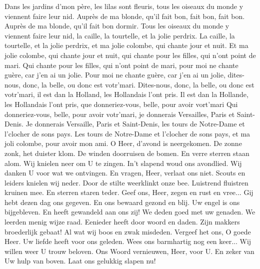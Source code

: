 \documentclass{article}
\begin{document}
\begin{songs}{}
\begin{intersong}
\end{intersong}
\beginverse
Dans les jardins d'mon père, les lilas sont fleuris, tous les oiseaux du monde y viennent faire leur nid.
\endverse
\beginchorus
Auprès de ma blonde, qu'il fait bon, fait bon, fait bon.
Auprès de ma blonde, qu'il fait bon dormir.
\endchorus
\beginverse
Tous les oiseaux du monde y viennent faire leur nid, la caille, la tourtelle, et la jolie perdrix.
\endverse
\beginverse
La caille, la tourtelle, et la jolie perdrix, et ma jolie colombe, qui chante jour et nuit.
\endverse
\beginverse
Et ma jolie colombe, qui chante jour et nuit, qui chante pour les filles, qui n’ont point de mari.
\endverse
\beginverse
Qui chante pour les filles, qui n’ont point de mari, pour moi ne chante guère, car j’en ai un jolie.
\endverse
\beginverse
Pour moi ne chante guère, car j’en ai un jolie, dites-nous, donc, la belle, ou donc est votr’mari.
\endverse
\beginverse
Dites-nous, donc, la belle, ou donc est votr’mari, il est dan la Holland, les Hollandais l’ont pris.
\endverse
\beginverse
Il est dan la Hollande, les Hollandais l’ont pris, que donneriez-vous, belle, pour avoir vort’mari
\endverse
\beginverse
Qui donneriez-vous, belle, pour avoir votr’mari, je donnerais Versailles, Paris et Saint-Denis.
\endverse
\beginverse
Je donnerais Versaille, Paris et Saint-Denis, les tours de Notre-Dame et l’clocher de sons pays.
\endverse
\beginverse
Les tours de Notre-Dame et l’clocher de sons pays, et ma joli colombe, pour avoir mon ami.
\endverse
\endsong
{}
\beginverse
O Heer, d'avond is neergekomen. De zonne zonk, het duister klom. De winden doorruisen de bomen. En verre sterren staan alom. Wij knielen neer om U te zingen. In't slapend woud ons avondlied. Wij danken U voor wat we ontvingen. En vragen, Heer, verlaat ons niet.
\endverse
\beginchorus
Scouts en leiders knielen wij neder. Door de stilte weerklinkt onze bee. Luistrend fluistren kruinen mee. En sterren staren teder. Geef ons, Heer, zegen en rust en vree...
\endchorus
\beginverse
Gij hebt dezen dag ons gegeven. En ons bewaard gezond en blij. Uw engel is ons bijgebleven. En heeft gewandeld aan ons zij! We deden goed met uw genaden. We leerden menig wijze raad. Eenieder heeft door woord en daden. Zijn makkers broederlijk gebaat!
\endverse
\beginverse
Al wat wij boos en zwak misdeden. Vergeef het ons, O goede Heer. Uw liefde heeft voor ons geleden. Wees ons barmhartig nog een keer... Wij willen weer U trouw beloven. Ons Woord vernieuwen, Heer, voor U. En zeker van Uw hulp van boven. Laat ons gelukkig slapen nu!
\endverse

\end{songs}
\end{document}
